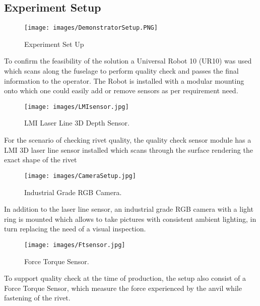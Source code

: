 \documentclass{article}
\begin{document}
\subsection{Experiment Setup}


\begin{figure}[H]
        \centering
        \texttt{[image: images/DemonstratorSetup.PNG]}
        \caption{Experiment Set Up }
         \label{fig:ExperimentSetUp}
        \end{figure}

To confirm the feasibility of the solution a Universal Robot 10 (UR10) was used which scans along the fuselage  to perform quality check and passes the final information to the operator. The Robot is installed with a modular mounting onto which one could easily add or remove sensors as per requirement need.



\begin{figure}[H]
        \centering
        \texttt{[image: images/LMIsensor.jpg]}
        \caption{LMI Laser Line 3D Depth Sensor.}
         \label{fig:LMIsensor}
        \end{figure}

For the scenario of checking rivet quality, the quality check sensor module has a LMI 3D laser line sensor installed which scans through the surface rendering the exact shape of the rivet\\


\begin{figure}[H]
        \centering
        \texttt{[image: images/CameraSetup.jpg]}
        \caption{Industrial Grade RGB Camera. }
         \label{fig:cameraSetup}
        \end{figure}
        
In addition to the laser line sensor, an industrial grade RGB camera with a light ring is mounted which allows to take pictures with consistent ambient lighting, in turn replacing the need of a visual inspection.\\


\begin{figure}[H]
        \centering
        \texttt{[image: images/Ftsensor.jpg]}
        \caption{Force Torque Sensor. }
         \label{fig Sensor}
        \end{figure}

To support quality check at the time of production, the setup also consist of a Force Torque Sensor, which measure the force experienced by the anvil while fastening of the rivet.
\end{document}
